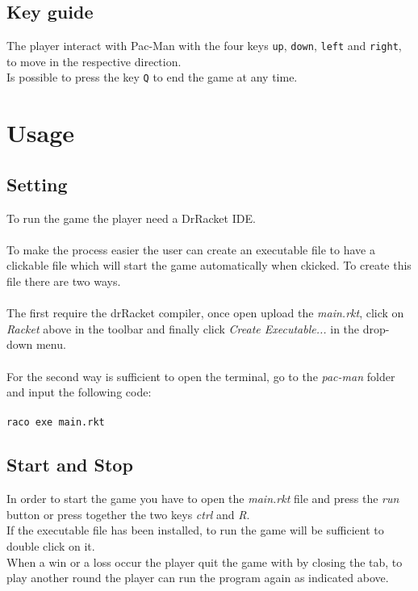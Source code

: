 \documentclass{article}
\begin{document}
\subsection{Key guide}
The player interact with Pac-Man with the four keys \texttt{up}, \texttt{down}, \texttt{left} and \texttt{right}, to move in the respective direction.
\\
Is possible to press the key \texttt{Q} to end the game at any time.

 
  \section{Usage}
  
  \subsection{Setting}
To run the game the player need a DrRacket IDE.\\
\\
To make the process easier the user can create an executable file to have a clickable file which will start the game automatically when ckicked. To create this file there are two ways.\\
\\
The first require the drRacket compiler, once open upload the \textit{main.rkt}, click on \textit{Racket} above in the toolbar and finally click \textit{Create Executable...} in the drop-down menu.\\
\\
For the second way is sufficient to open the terminal, go to the \textit{pac-man} folder and input the following code:\\
\\
\texttt{raco exe main.rkt}

\subsection{Start and Stop}
In order to start the game you have to open the \textit{main.rkt} file and press the \textit{run} button or press together the two keys \textit{ctrl} and \textit{R}.\\
If the executable file has been installed, to run the game will be sufficient to double click on it. 
\\
When a win or a loss occur the player quit the game with by closing the tab, to play another round the player can run the program again as indicated above.

 
\end{document}
